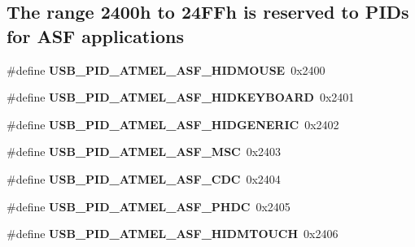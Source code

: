 \subsection*{The range 2400h to 24\+F\+Fh is reserved to P\+I\+Ds for A\+SF applications}
\begin{DoxyCompactItemize}
\item 
\mbox{\label{group__usb__atmel__ids__group_ga3a1418d88f7099d73faec60665ce7d81}} 
\#define {\bfseries U\+S\+B\+\_\+\+P\+I\+D\+\_\+\+A\+T\+M\+E\+L\+\_\+\+A\+S\+F\+\_\+\+H\+I\+D\+M\+O\+U\+SE}~0x2400
\item 
\mbox{\label{group__usb__atmel__ids__group_gac72181eda2a796ac5a4a71e8e95c87eb}} 
\#define {\bfseries U\+S\+B\+\_\+\+P\+I\+D\+\_\+\+A\+T\+M\+E\+L\+\_\+\+A\+S\+F\+\_\+\+H\+I\+D\+K\+E\+Y\+B\+O\+A\+RD}~0x2401
\item 
\mbox{\label{group__usb__atmel__ids__group_gaf0a0133931a417e588db53155f0b57bf}} 
\#define {\bfseries U\+S\+B\+\_\+\+P\+I\+D\+\_\+\+A\+T\+M\+E\+L\+\_\+\+A\+S\+F\+\_\+\+H\+I\+D\+G\+E\+N\+E\+R\+IC}~0x2402
\item 
\mbox{\label{group__usb__atmel__ids__group_ga95ee70f17ac736943794b9cf500a403d}} 
\#define {\bfseries U\+S\+B\+\_\+\+P\+I\+D\+\_\+\+A\+T\+M\+E\+L\+\_\+\+A\+S\+F\+\_\+\+M\+SC}~0x2403
\item 
\mbox{\label{group__usb__atmel__ids__group_ga76b8f8d1528bd59987d62aa478166265}} 
\#define {\bfseries U\+S\+B\+\_\+\+P\+I\+D\+\_\+\+A\+T\+M\+E\+L\+\_\+\+A\+S\+F\+\_\+\+C\+DC}~0x2404
\item 
\mbox{\label{group__usb__atmel__ids__group_ga2a6973f1a3071bfe3464a18186316a69}} 
\#define {\bfseries U\+S\+B\+\_\+\+P\+I\+D\+\_\+\+A\+T\+M\+E\+L\+\_\+\+A\+S\+F\+\_\+\+P\+H\+DC}~0x2405
\item 
\mbox{\label{group__usb__atmel__ids__group_gaa2e110f5159d2800f0d32db7e9d95d6a}} 
\#define {\bfseries U\+S\+B\+\_\+\+P\+I\+D\+\_\+\+A\+T\+M\+E\+L\+\_\+\+A\+S\+F\+\_\+\+H\+I\+D\+M\+T\+O\+U\+CH}~0x2406
\item 
\mbox{\label{group__usb__atmel__ids__group_ga830b4cd806d1622c0a701b33f382e123}} 

\end{DoxyCompactItemize}
